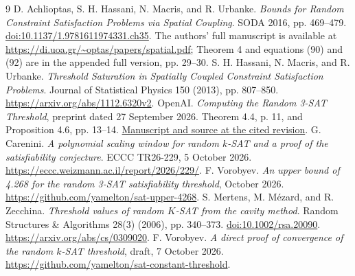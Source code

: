 \documentclass[11pt]{article}
\begin{document}
\begin{thebibliography}{9}
D. Achlioptas, S. H. Hassani, N. Macris, and R. Urbanke.
\emph{Bounds for Random Constraint Satisfaction Problems via Spatial
Coupling}. SODA 2016, pp. 469--479.
\href{https://doi.org/10.1137/1.9781611974331.ch35}{doi:10.1137/1.9781611974331.ch35}.
The authors' full manuscript is available at
\url{https://di.uoa.gr/~optas/papers/spatial.pdf}; Theorem 4 and
equations (90) and (92) are in the appended full version, pp. 29--30.
S. H. Hassani, N. Macris, and R. Urbanke.
\emph{Threshold Saturation in Spatially Coupled Constraint Satisfaction
Problems}. Journal of Statistical Physics 150 (2013), pp. 807--850.
\url{https://arxiv.org/abs/1112.6320v2}.
OpenAI. \emph{Computing the Random 3-SAT Threshold}, preprint dated
27 September 2026. Theorem 4.4, p. 11, and Proposition 4.6, pp. 13--14.
\href{https://github.com/openai/math/tree/adc7f1241b42e322a6451854ab7e4b4c146bf78a/preprints/Computing-the-Random-3-SAT-Threshold-September-27-2026}{Manuscript and source at the cited revision}.
G. Carenini. \emph{A polynomial scaling window for random $k$-SAT
and a proof of the satisfiability conjecture}. ECCC TR26-229,
5 October 2026. \url{https://eccc.weizmann.ac.il/report/2026/229/}.
F. Vorobyev. \emph{An upper bound of 4.268 for the random 3-SAT
satisfiability threshold}, October 2026.
\url{https://github.com/yamelton/sat-upper-4268}.
S. Mertens, M. M\'ezard, and R. Zecchina.
\emph{Threshold values of random $K$-SAT from the cavity method}.
Random Structures \& Algorithms 28(3) (2006), pp. 340--373.
\href{https://doi.org/10.1002/rsa.20090}{doi:10.1002/rsa.20090}.
\url{https://arxiv.org/abs/cs/0309020}.
F. Vorobyev. \emph{A direct proof of convergence of the random
$k$-SAT threshold}, draft, 7 October 2026.
\url{https://github.com/yamelton/sat-constant-threshold}.
\end{thebibliography}
\end{document}
